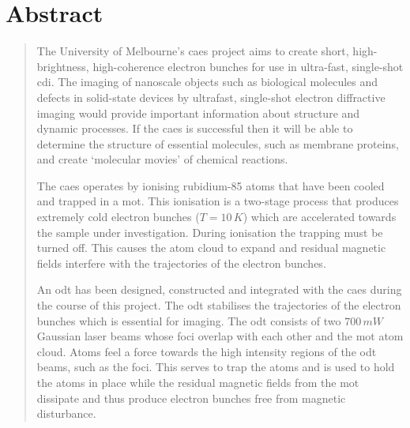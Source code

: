 \chapter*{\centering \LARGE Abstract}
\begin{quotation}
\noindent

The University of Melbourne's \gls{caes} project aims to create short, high-brightness, high-coherence electron bunches for use in ultra-fast, single-shot \gls{cdi}. The imaging of nanoscale objects such as biological molecules and defects in solid-state devices by ultrafast, single-shot electron diffractive imaging would provide important information about structure and dynamic processes. If the \gls{caes} is successful then it will be able to determine the structure of essential molecules, such as membrane proteins, and create `molecular movies' of chemical reactions.

The \gls{caes} operates by ionising rubidium-85 atoms that have been cooled and trapped in a \gls{mot}. This ionisation is a two-stage process that produces extremely cold electron bunches ($T=10\,\unit{K}$) which are accelerated towards the sample under investigation. During ionisation the trapping must be turned off. This causes the atom cloud to expand and residual magnetic fields interfere with the trajectories of the electron bunches.

An \gls{odt} has been designed, constructed and integrated with the \gls{caes} during the course of this project. The \gls{odt} stabilises the trajectories of the electron bunches which is essential for imaging. The \gls{odt} consists of two $700\,\unit{mW}$ Gaussian laser beams whose foci overlap with each other and the \gls{mot} atom cloud. Atoms feel a force towards the high intensity regions of the \gls{odt} beams, such as the foci. This serves to trap the atoms and is used to hold the atoms in place while the residual magnetic fields from the \gls{mot} dissipate and thus produce electron bunches free from magnetic disturbance.

\end{quotation}
\clearpage
